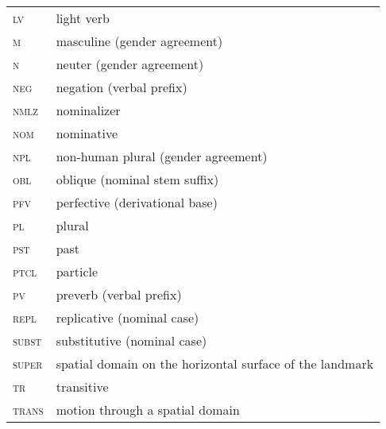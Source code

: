 ﻿\documentclass[output=paper]{langsci/langscibook}
\begin{document}
\begin{longtable}[l]{@{}ll@{}}
\textsc{lv}	& light verb \\
\textsc{m}	& masculine (gender agreement) \\
\textsc{n}	& neuter (gender agreement) \\
\textsc{neg}	& negation (verbal prefix) \\
\textsc{nmlz}	& nominalizer \\
\textsc{nom}	& nominative \\
\textsc{npl}	& non-human plural (gender agreement) \\
\textsc{obl}	& oblique (nominal stem suffix) \\
\textsc{pfv}	& perfective (derivational base) \\
\textsc{pl}	& plural \\
\textsc{pst}	& past \\
\textsc{ptcl}	& particle \\
\textsc{pv}	& preverb (verbal prefix) \\
\textsc{repl}	& replicative (nominal case) \\
\textsc{subst}	& substitutive (nominal case) \\
\textsc{super}	& spatial domain on the horizontal surface of the landmark \\
\textsc{tr}	& transitive \\
\textsc{trans}	& motion through a spatial domain \\
\end{longtable}

\printbibliography[heading=subbibliography,notkeyword=this]




\iffalse

\section*{References}


  
Daniel M. (2019). Mehweb verb morphology. In M. Daniel, D. Ganenkov, N. Dobrushina (Ed.), Mehweb: Selected essays on phonology, morphology and syntax. Berlin, Language Science Press.

Haspelmath, M., \& Sims, A. (2010). Understanding Morphology. Oxford University Press.

Kibrik A. E. (2003). Konstanty i peremennye jazyka. Sankt-Peterburg, Aleteja.

Rubin, E. (2001). Figure and Ground. In Yantis, S.(Ed.), Visual Perception. (pp. 225-229). Philadelphia, Psychology Press.

Magometov A. A. (1982). Megebskij dialekt darginskogo jazyka (Issledovanie i
teksty). Tbilisi, Mecniereba.

Moroz G. (2019). Phonology of Mehweb. In M. Daniel, D. Ganenkov, N. Dobrushina (Ed.), Mehweb: Selected essays on phonology, morphology and syntax. Berlin, Language Science Press.
  

\fi
\end{document}
